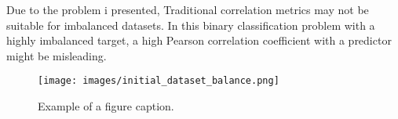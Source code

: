 Due to the problem i presented, Traditional correlation metrics may not be suitable for imbalanced datasets. In this binary classification problem with a highly imbalanced target, a high Pearson correlation coefficient with a predictor might be misleading.

\begin{figure}[htbp]
    \centerline{\texttt{[image: images/initial\_dataset\_balance.png]}}
    \caption{Example of a figure caption.}
    \label{initial_dataset_balance}
\end{figure}





